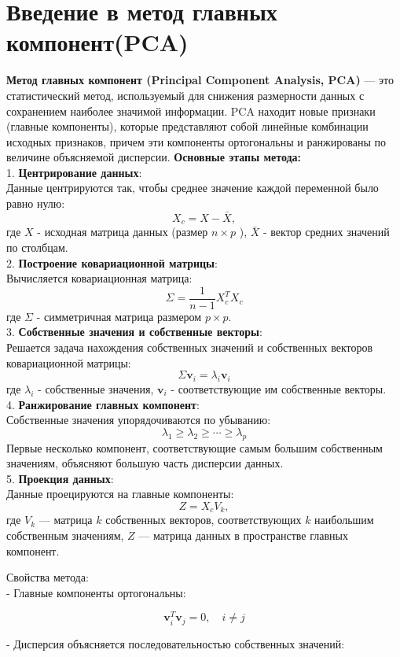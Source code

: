 \section{Введение в метод главных компонент(PCA)}
\textbf{Метод главных компонент (Principal Component Analysis, PCA)} — это статистический метод, используемый для снижения размерности данных с сохранением наиболее значимой информации. PCA находит новые признаки (главные компоненты), 
которые представляют собой линейные комбинации исходных признаков, причем эти компоненты ортогональны и ранжированы по величине объясняемой дисперсии.
\textbf{Основные этапы метода:} \\
1. \textbf{Центрирование данных}:\\ Данные центрируются так, чтобы среднее значение каждой переменной было равно нулю:
$$
X_c=X-\bar{X},
$$
где $X$ - исходная матрица данных (размер $n \times p$ ), $\bar{X}$ - вектор средних значений по столбцам.\\
2. \textbf{Построение ковариационной матрицы}: \\ Вычисляется ковариационная матрица:
$$
\Sigma=\frac{1}{n-1} X_c^T X_c
$$
где $\Sigma$ - симметричная матрица размером $p \times p$.\\
3. \textbf{Собственные значения и собственные векторы}: \\ Решается задача нахождения собственных значений и собственных векторов ковариационной матрицы:
$$
\Sigma \mathbf{v}_i=\lambda_i \mathbf{v}_i
$$
где $\lambda_i$ - собственные значения, $\mathbf{v}_i$ - соответствующие им собственные векторы.\\
4. \textbf{Ранжирование главных компонент}: \\ Собственные значения упорядочиваются по убыванию:
$$
\lambda_1 \geq \lambda_2 \geq \cdots \geq \lambda_p
$$
Первые несколько компонент, соответствующие самым большим собственным значениям, объясняют большую часть дисперсии данных.\\
5. \textbf{Проекция данных}: \\ Данные проецируются на главные компоненты:
$$
Z=X_c V_k,
$$
где $V_k$ — матрица $k$ собственных векторов, соответствующих $k$ наибольшим собственным значениям, $Z$ — матрица данных в пространстве главных компонент.

Свойства метода: \\
- Главные компоненты ортогональны:

$$
\mathbf{v}_i^T \mathbf{v}_j=0, \quad i \neq j
$$

- Дисперсия объясняется последовательностью собственных значений:

